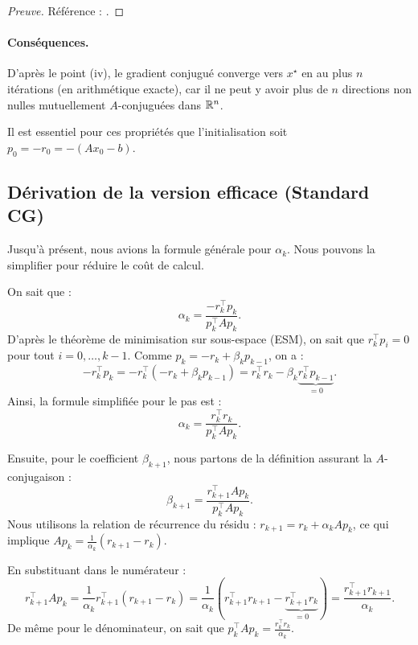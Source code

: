 \begin{proof}[Preuve]
Référence : \cite{nocedal2006numerical}.
\end{proof}

\paragraph{Conséquences.}
D'après le point (iv), le gradient conjugué converge vers $x^\star$ en au plus $n$ itérations (en arithmétique exacte), car il ne peut y avoir plus de $n$ directions non nulles mutuellement $A$-conjuguées dans $\mathbb{R}^n$.

\begin{remarque}
Il est essentiel pour ces propriétés que l'initialisation soit $p_0 = -r_0 = -(A x_0 - b)$.
\end{remarque}

\subsection{Dérivation de la version efficace (Standard CG)}
\label{sec:efficient-cg}

Jusqu'à présent, nous avions la formule générale pour $\alpha_k$. Nous pouvons la simplifier pour réduire le coût de calcul.

On sait que :
\[ \alpha_k = \frac{-r_k^\top p_k}{p_k^\top A p_k}. \]
D'après le théorème de minimisation sur sous-espace (ESM), on sait que $r_k^\top p_i = 0$ pour tout $i = 0, \dots, k-1$.
Comme $p_k = -r_k + \beta_k p_{k-1}$, on a :
\[ 
-r_k^\top p_k = -r_k^\top (-r_k + \beta_k p_{k-1}) = r_k^\top r_k - \beta_k \underbrace{r_k^\top p_{k-1}}_{=0}.
\]
Ainsi, la formule simplifiée pour le pas est :
\[
\boxed{\alpha_k = \frac{r_k^\top r_k}{p_k^\top A p_k}}.
\]

Ensuite, pour le coefficient $\beta_{k+1}$, nous partons de la définition assurant la $A$-conjugaison :
\[
\beta_{k+1} = \frac{r_{k+1}^\top A p_k}{p_k^\top A p_k}.
\]
Nous utilisons la relation de récurrence du résidu : $r_{k+1} = r_k + \alpha_k A p_k$, ce qui implique $A p_k = \frac{1}{\alpha_k}(r_{k+1} - r_k)$.

En substituant dans le numérateur :
\[
r_{k+1}^\top A p_k = \frac{1}{\alpha_k} r_{k+1}^\top (r_{k+1} - r_k) = \frac{1}{\alpha_k} (r_{k+1}^\top r_{k+1} - \underbrace{r_{k+1}^\top r_k}_{=0}) = \frac{r_{k+1}^\top r_{k+1}}{\alpha_k}.
\]
De même pour le dénominateur, on sait que $p_k^\top A p_k = \frac{r_k^\top r_k}{\alpha_k}$.

